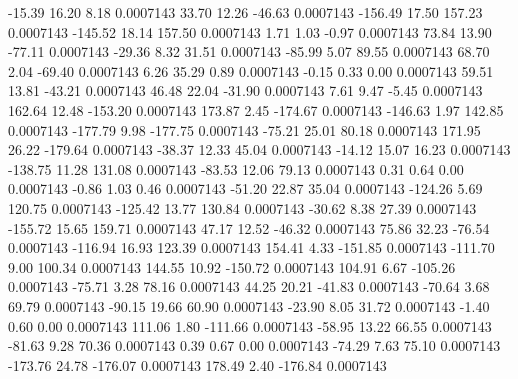       -15.39       16.20        8.18     0.0007143
       33.70       12.26      -46.63     0.0007143
     -156.49       17.50      157.23     0.0007143
     -145.52       18.14      157.50     0.0007143
        1.71        1.03       -0.97     0.0007143
       73.84       13.90      -77.11     0.0007143
      -29.36        8.32       31.51     0.0007143
      -85.99        5.07       89.55     0.0007143
       68.70        2.04      -69.40     0.0007143
        6.26       35.29        0.89     0.0007143
       -0.15        0.33        0.00     0.0007143
       59.51       13.81      -43.21     0.0007143
       46.48       22.04      -31.90     0.0007143
        7.61        9.47       -5.45     0.0007143
      162.64       12.48     -153.20     0.0007143
      173.87        2.45     -174.67     0.0007143
     -146.63        1.97      142.85     0.0007143
     -177.79        9.98     -177.75     0.0007143
      -75.21       25.01       80.18     0.0007143
      171.95       26.22     -179.64     0.0007143
      -38.37       12.33       45.04     0.0007143
      -14.12       15.07       16.23     0.0007143
     -138.75       11.28      131.08     0.0007143
      -83.53       12.06       79.13     0.0007143
        0.31        0.64        0.00     0.0007143
       -0.86        1.03        0.46     0.0007143
      -51.20       22.87       35.04     0.0007143
     -124.26        5.69      120.75     0.0007143
     -125.42       13.77      130.84     0.0007143
      -30.62        8.38       27.39     0.0007143
     -155.72       15.65      159.71     0.0007143
       47.17       12.52      -46.32     0.0007143
       75.86       32.23      -76.54     0.0007143
     -116.94       16.93      123.39     0.0007143
      154.41        4.33     -151.85     0.0007143
     -111.70        9.00      100.34     0.0007143
      144.55       10.92     -150.72     0.0007143
      104.91        6.67     -105.26     0.0007143
      -75.71        3.28       78.16     0.0007143
       44.25       20.21      -41.83     0.0007143
      -70.64        3.68       69.79     0.0007143
      -90.15       19.66       60.90     0.0007143
      -23.90        8.05       31.72     0.0007143
       -1.40        0.60        0.00     0.0007143
      111.06        1.80     -111.66     0.0007143
      -58.95       13.22       66.55     0.0007143
      -81.63        9.28       70.36     0.0007143
        0.39        0.67        0.00     0.0007143
      -74.29        7.63       75.10     0.0007143
     -173.76       24.78     -176.07     0.0007143
      178.49        2.40     -176.84     0.0007143
